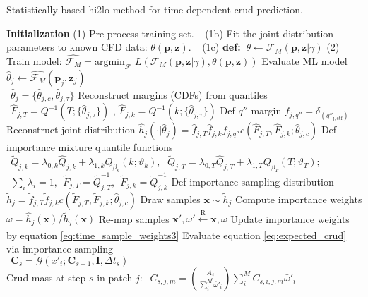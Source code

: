 \begin{algorithm}[H]
    \caption{Statistically based hi2lo method for time dependent crud prediction.}
    \begin{algorithmic}[1]      
        \STATE \textbf{Initialization}  
        \STATE (1) Pre-process training set.  
        \STATE $\ \ $   (1b) Fit the joint distribution parameters to known CFD data: $\theta(\mathbf p, \mathbf z)$.  
        \STATE $\ \ $   (1c) \textbf{def:}  $\ \theta \leftarrow \mathcal F_M(\mathbf p, \mathbf z | \gamma)$
        \STATE (2) Train model:  $\hat{\mathcal F_M} =  \mathrm{argmin}_{\mathcal F}$
        $L(\mathcal{F}_M (\mathbf p, \mathbf z| \gamma), \theta(\mathbf p, \mathbf z)) $
          \STATE Evaluate ML model $\hat \theta_j \leftarrow \hat{\mathcal F_M}(\mathbf p_j, \mathbf z_j)$ \\
               $\ \ \hat \theta_j = \{\hat \theta_{j,c}, \hat \theta_{j,\tau} \}$
          \STATE Reconstruct margins (CDFs) from quantiles  \\
            $\ \ \hat F_{j,T}= Q^{-1}(T; \{\hat{\theta}_{j,\tau} \})$ , $\hat F_{j,k}= Q^{-1}(k; \{\hat{\theta}_{j,\tau} \})$
          \STATE Def $q''$ margin  $f_{j,q''} = \delta_{(q''_\mathrm{j,ctf})}$
          \STATE Reconstruct joint distribution $\hat h_j(\cdot |\hat \theta_j) = \hat f_{j,T} \hat f_{j,k} f_{j,q''} c(\hat F_{j,T}, \hat F_{j,k}; \hat \theta_{j,c})$ \;
        \ENDFOR
              \STATE Def importance  mixture quantile functions \\
                $\ \ \tilde Q_{j,k} = \lambda_{0,k} \hat Q_{j,k}  + \lambda_{1,k} Q_{\beta_k}(k; \vartheta_k)$, 
                $\ \ \tilde Q_{j,T} = \lambda_{0,T} \hat Q_{j,T}  + \lambda_{1,T} Q_{\beta_T}(T; \vartheta_T); $ \\
                $\ \ \sum_i \lambda_i = 1, \ \ \tilde F_{j,T} = \tilde Q^{-1}_{j,T},\ \  \tilde F_{j,k} = \tilde Q^{-1}_{j,k} $
              \STATE Def importance sampling distribution $\tilde h_j = \tilde f_{j,T} \tilde f_{j,k} c(\tilde F_{j,T}, \tilde F_{j,k}; \hat \theta_{j,c}) $
              \STATE Draw samples $\mathbf x \sim \tilde h_j$ \;
              \STATE Compute importance weights $\omega = \hat h_j(\mathbf x) /  \tilde h_j(\mathbf x) $
              \STATE Re-map samples  $\mathbf x', \omega' \xleftarrow[\text{ }]{\text{R}} \mathbf x, \omega $
              \STATE Update importance weights by equation \ref{eq:time_sample_weights3}
              \STATE Evaluate equation \ref{eq:expected_crud} via importance sampling \\
                $\ \ \mathbf C_s = \mathcal G(x'_i; \mathbf C_{s-1}, \mathbf I, \Delta t_s)$ \\
              \STATE Crud mass at step $s$ in patch $j$:
                $\ \ C_{s,j,m} = \left( \frac{A_j}{\sum_i^M \bar \omega'_i} \right) \sum_i^M C_{s,i,j,m} \bar \omega'_i$
          \ENDFOR
        \ENDFOR
        \ENDFOR
    \end{algorithmic}
    \label{algo:hi2lo_crud_algo}
\end{algorithm}

